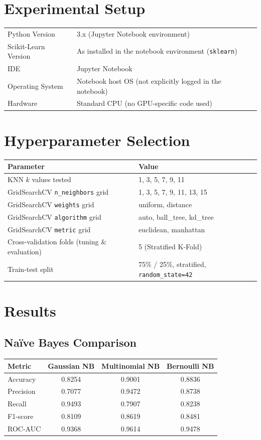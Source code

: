 \documentclass[12pt,a4paper]{article}
\begin{document}
\section{Experimental Setup}
\begin{tabular}{ll}
\toprule
Python Version & 3.x (Jupyter Notebook environment) \\
Scikit-Learn Version & As installed in the notebook environment (\texttt{sklearn}) \\
IDE & Jupyter Notebook \\
Operating System & Notebook host OS (not explicitly logged in the notebook) \\
Hardware & Standard CPU (no GPU-specific code used) \\
\bottomrule
\end{tabular}

\section{Hyperparameter Selection}

\begin{tabular}{ll}
\toprule
Parameter & Value\\
\midrule
KNN $k$ values tested & 1, 3, 5, 7, 9, 11 \\
GridSearchCV \texttt{n\_neighbors} grid & 1, 3, 5, 7, 9, 11, 13, 15 \\
GridSearchCV \texttt{weights} grid & uniform, distance \\
GridSearchCV \texttt{algorithm} grid & auto, ball\_tree, kd\_tree \\
GridSearchCV \texttt{metric} grid & euclidean, manhattan \\
Cross-validation folds (tuning \& evaluation) & 5 (Stratified K-Fold) \\
Train-test split & 75\% / 25\%, stratified, \texttt{random\_state=42} \\
\bottomrule
\end{tabular}

\section{Results}

\subsection*{Na\"ive Bayes Comparison}
\begin{tabular}{lccc}
\toprule
Metric & Gaussian NB & Multinomial NB & Bernoulli NB \\
\midrule
Accuracy  & 0.8254 & 0.9001 & 0.8836 \\
Precision & 0.7077 & 0.9472 & 0.8738 \\
Recall    & 0.9493 & 0.7907 & 0.8238 \\
F1-score  & 0.8109 & 0.8619 & 0.8481 \\
ROC-AUC   & 0.9368 & 0.9614 & 0.9478 \\
\bottomrule
\end{tabular}
\end{document}

